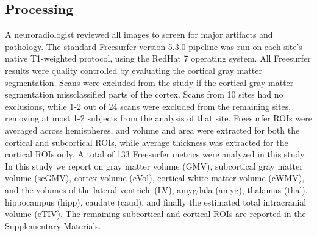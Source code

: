 \subsection{Processing}
 A neuroradiologist reviewed all images to screen for major artifacts and pathology. The standard Freesurfer\cite{freesurferPaper} version 5.3.0 pipeline was run on each site's native T1-weighted protocol, using the RedHat 7 operating system. All Freesurfer results were quality controlled by evaluating the cortical gray matter segmentation. Scans were excluded from the study if the cortical gray matter segmentation missclassified parts of the cortex. Scans from 10 sites had no exclusions, while 1-2 out of 24 scans were excluded from the remaining sites, removing at most 1-2 subjects from the analysis of that site. Freesurfer ROIs were averaged across hemispheres, and volume and area were extracted for both the cortical and subcortical ROIs, while average thickness was extracted for the cortical ROIs only. A total of 133 Freesurfer metrics were analyzed in this study. In this study we report on gray matter volume (GMV), subcortical gray matter volume (scGMV), cortex volume (cVol), cortical white matter volume (cWMV), and the volumes of the lateral ventricle (LV), amygdala (amyg), thalamus (thal), hippocampus (hipp), caudate (caud), and finally the estimated total intracranial volume (eTIV). The remaining subcortical  and cortical ROIs are reported in the Supplementary Materials.